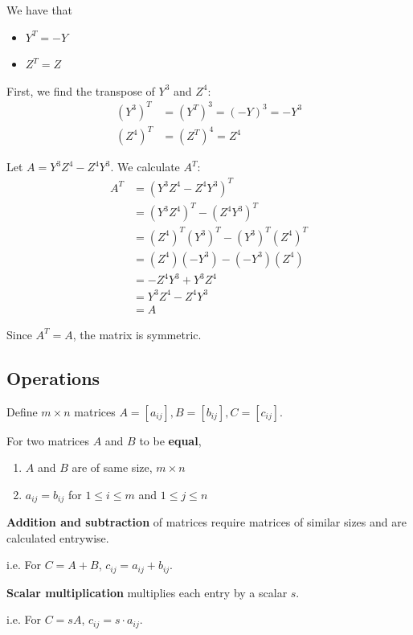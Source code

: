 \documentclass[../linear-algebra.tex]{subfiles}
\begin{document}
\bigskip

\noindent We have that
\begin{itemize}
    \item $Y^T = -Y$
    \item $Z^T = Z$
\end{itemize}

\noindent First, we find the transpose of $Y^3$ and $Z^4$:
\begin{align*}
    (Y^3)^T &= (Y^T)^3 = (-Y)^3 = -Y^3 \\
    (Z^4)^T &= (Z^T)^4 = Z^4
\end{align*}

\noindent Let $A = Y^3Z^4 - Z^4Y^3$. We calculate $A^T$:
\begin{align*}
    A^T &= (Y^3Z^4 - Z^4Y^3)^T \\
    &= (Y^3Z^4)^T - (Z^4Y^3)^T \tag{Distributive property} \\
    &= (Z^4)^T (Y^3)^T - (Y^3)^T (Z^4)^T \tag{Reversal law} \\
    &= (Z^4)(-Y^3) - (-Y^3)(Z^4) \tag{Substitution} \\
    &= -Z^4Y^3 + Y^3Z^4 \\
    &= Y^3Z^4 - Z^4Y^3 \\
    &= A
\end{align*}

\noindent Since $A^T = A$, the matrix is symmetric.

\subsection{Operations}
Define $m\times n$ matrices $A = [a_{ij}], B=[b_{ij}], C=[c_{ij}]$.

\noindent For two matrices $A$ and $B$ to be \textbf{equal},
\begin{enumerate}
    \item $A$ and $B$ are of same size, $m\times n$
    \item $a_{ij} = b_{ij}$ for $1\leq i\leq m$ and $1\leq j\leq n$
\end{enumerate}

\noindent \textbf{Addition and subtraction} of matrices require matrices of similar sizes
and are calculated entrywise.

i.e. For $C=A+B$, $c_{ij} = a_{ij} + b_{ij}$.

\noindent \textbf{Scalar multiplication} multiplies each entry by a scalar $s$.

i.e. For $C=sA$, $c_{ij} = s\cdot a_{ij}$.
\end{document}
